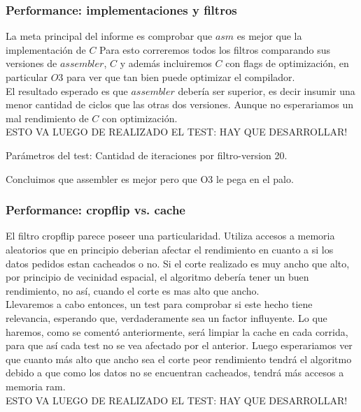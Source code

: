\subsubsection{Performance: implementaciones y filtros}

La meta principal del informe es comprobar que $asm$ es mejor que la implementación de $C$
Para esto correremos todos los filtros comparando sus versiones de $assembler$, $C$ y además incluiremos $C$ con flags de optimización, en particular $O3$ para ver que tan bien puede optimizar el compilador. \\

El resultado esperado es que $assembler$ debería ser superior, es decir insumir una menor cantidad de ciclos que las otras dos versiones. Aunque no esperariamos un mal rendimiento de $C$ con optimización. \\

ESTO VA LUEGO DE REALIZADO EL TEST: HAY QUE DESARROLLAR!

Parámetros del test: 
Cantidad de iteraciones por filtro-version 20.

Concluimos que assembler es mejor pero que O3 le pega en el palo. \\

\subsubsection{Performance: cropflip vs. cache}

El filtro cropflip parece poseer una particularidad. Utiliza accesos a memoria aleatorios que en principio deberian afectar el rendimiento en cuanto a si los datos pedidos estan cacheados o no. 
Si el corte realizado es muy ancho que alto, por principio de vecinidad espacial, el algoritmo debería tener un buen rendimiento, no así, cuando el corte es mas alto que ancho. \\

Llevaremos a cabo entonces, un test para comprobar si este hecho tiene relevancia, esperando que, verdaderamente sea un factor influyente.
Lo que haremos, como se comentó anteriormente, será limpiar la cache en cada corrida, para que así cada test no se vea afectado por el anterior. Luego esperariamos ver que cuanto más alto que ancho sea el corte peor rendimiento tendrá el algoritmo debido a que como los datos no se encuentran cacheados, tendrá más accesos a memoria ram. \\

ESTO VA LUEGO DE REALIZADO EL TEST: HAY QUE DESARROLLAR!

